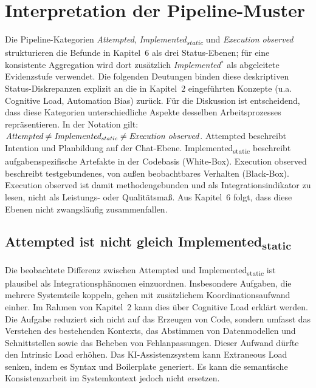 \section{Interpretation der Pipeline-Muster}
\label{sec:discussion_pipeline}

Die Pipeline-Kategorien  \textit{Attempted},  \textit{Implemented\textsubscript{static}} und  \textit{Execution observed} strukturieren die Befunde in Kapitel~6 als drei Status-Ebenen; für eine konsistente Aggregation wird dort zusätzlich  \textit{Implemented$^\ast$} als abgeleitete Evidenzstufe verwendet.
Die folgenden Deutungen binden diese deskriptiven Status-Diskrepanzen explizit an die in Kapitel~2 eingeführten Konzepte (u.a. Cognitive Load, Automation Bias) zurück.
Für die Diskussion ist entscheidend, dass diese Kategorien unterschiedliche Aspekte desselben Arbeitsprozesses repräsentieren.
In der Notation gilt: $ \textit{Attempted} \neq  \textit{Implemented\textsubscript{static}} \neq  \textit{Execution observed}$.
Attempted beschreibt Intention und Planbildung auf der Chat-Ebene.
Implemented\textsubscript{static} beschreibt aufgabenspezifische Artefakte in der Codebasis (White-Box).
Execution observed beschreibt testgebundenes, von außen beobachtbares Verhalten (Black-Box).
Execution observed ist damit methodengebunden und als Integrationsindikator zu lesen, nicht als Leistungs- oder Qualitätsmaß.
Aus Kapitel~6 folgt, dass diese Ebenen nicht zwangsläufig zusammenfallen.

\subsection{Attempted ist nicht gleich \texorpdfstring{Implemented\textsubscript{static}}{Implementedstatic}}
\label{sec:discussion_attempted_vs_implemented}

Die beobachtete Differenz zwischen Attempted und Implemented\textsubscript{static} ist plausibel als Integrationsphänomen einzuordnen.
Insbesondere Aufgaben, die mehrere Systemteile koppeln, gehen mit zusätzlichem Koordinationsaufwand einher.
Im Rahmen von Kapitel~2 kann dies über Cognitive Load erklärt werden.
Die Aufgabe reduziert sich nicht auf das Erzeugen von Code, sondern umfasst das Verstehen des bestehenden Kontexts, das Abstimmen von Datenmodellen und Schnittstellen sowie das Beheben von Fehlanpassungen.
Dieser Aufwand dürfte den Intrinsic Load erhöhen.
Das KI-Assistenzsystem kann Extraneous Load senken, indem es Syntax und Boilerplate generiert.
Es kann die semantische Konsistenzarbeit im Systemkontext jedoch nicht ersetzen.

